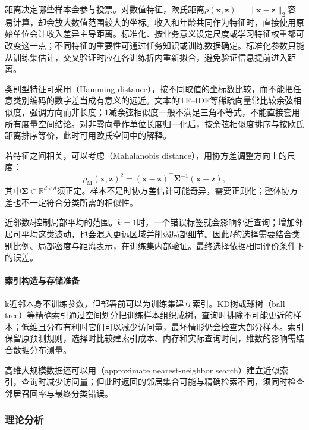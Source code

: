 距离决定哪些样本会参与投票。对数值特征，欧氏距离$\rho(\bm{x},\bm{z})=\lVert\bm{x}-\bm{z}\rVert_2$容易计算，却会放大数值范围较大的坐标。收入和年龄共同作为特征时，直接使用原始单位会让收入差异主导距离。标准化、按业务意义设定尺度或学习特征权重都可改变这一点；不同特征的重要性可通过任务知识或训练数据确定。标准化参数只能从训练集估计，交叉验证时应在各训练折内重新拟合，避免验证信息提前进入距离。

类别型特征可采用（Hamming distance），按不同取值的坐标数比较，而不能把任意类别编码的数字差当成有意义的远近。文本的TF--IDF等稀疏向量常比较余弦相似度，强调方向而非长度；$1$减余弦相似度一般不满足三角不等式，不能直接套用所有度量空间结论。对非零向量作单位长度归一化后，按余弦相似度排序与按欧氏距离排序等价，此时可用欧氏空间中的解释。

若特征之间相关，可以考虑（Mahalanobis distance），用协方差调整方向上的尺度：
\begin{equation}
  \rho_{\mathrm{M}}(\bm{x},\bm{z})^2
  =(\bm{x}-\bm{z})^\top
   \bm{\Sigma}^{-1}(\bm{x}-\bm{z}),
  \label{eq:classification-mahalanobis}
\end{equation}
其中$\bm{\Sigma}\in\mathbb{R}^{d\times d}$须正定。样本不足时协方差估计可能奇异，需要正则化；整体协方差也不一定符合分类所需的相似性。

近邻数$k$控制局部平均的范围。$k=1$时，一个错误标签就会影响邻近查询；增加邻居可平均这类波动，也会混入更远区域并削弱局部细节。因此$k$的选择需要结合类别比例、局部密度与距离表示，在训练集内部验证。最终选择依据相同评价条件下的误差。

\paragraph{索引构造与存储准备}
k近邻本身不训练参数，但部署前可以为训练集建立索引。KD树或球树（ball tree）等精确索引通过空间划分把训练样本组织成树，查询时排除不可能更近的样本；低维且分布有利时它们可以减少访问量，最坏情形仍会检查大部分样本。索引保留原预测规则，选择时比较建索引成本、内存和实际查询时间，维数的影响需结合数据分布测量。

高维大规模数据还可以用（approximate nearest-neighbor search）建立近似索引，查询时减少访问量；但此时返回的邻居集合可能与精确检索不同，须同时检查邻居召回率与最终分类错误。

\subsubsection{理论分析}
\label{sec:classification-knn-theory}

